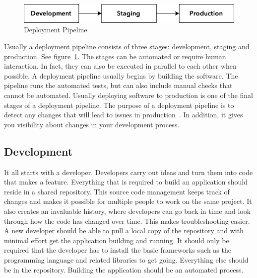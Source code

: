 \documentclass[english]{tktltiki2}
\begin{document}
\begin{figure}[h!]

    \vspace{1cm}
    \centering

    \includegraphics{figures/deployment-pipeline}

    \caption{Deployment Pipeline}
    \label{figure:deployment-pipeline}

    \vspace{1cm}

\end{figure}

Usually a deployment pipeline consists of three stages: development, staging and production. See figure~\ref{figure:deployment-pipeline}. The stages can be automated or require human interaction. In fact, they can also be executed in parallel to each other when possible. A deployment pipeline usually begins by building the software. The pipeline runs the automated tests, but can also include manual checks that cannot be automated. Usually deploying software to production is one of the final stages of a deployment pipeline. The purpose of a deployment pipeline is to detect any changes that will lead to issues in production~\cite{Fow13b}. In addition, it gives you visibility about changes in your development process.

\subsection{Development}

It all starts with a developer. Developers carry out ideas and turn them into code that makes a feature. Everything that is required to build an application should reside in a shared repository. This source code management keeps track of changes and makes it possible for multiple people to work on the same project. It also creates an invaluable history, where developers can go back in time and look through how the code has changed over time. This makes troubleshooting easier. A new developer should be able to pull a local copy of the repository and with minimal effort get the application building and running. It should only be required that the developer has to install the basic frameworks such as the programming language and related libraries to get going. Everything else should be in the repository. Building the application should be an automated process.
\end{document}
